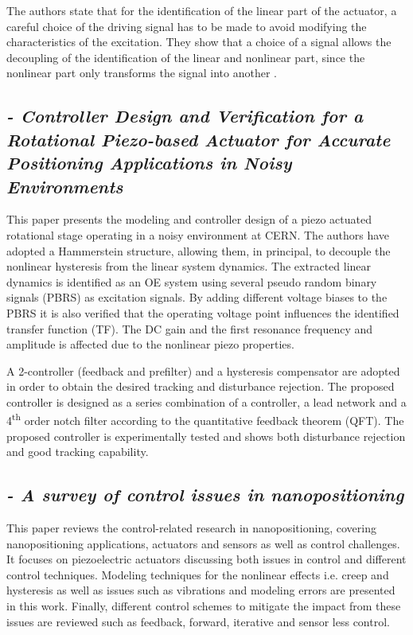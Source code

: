 The authors state that for the identification of the linear part of the actuator, a careful choice of the driving signal has to be made to avoid modifying the characteristics of the excitation. They show that a choice of a \abbrPBRS signal allows the decoupling of the identification of the linear and nonlinear part, since the nonlinear part only transforms the \abbrPBRS signal into another \abbrPBRS.



\subsection*{\citep*{ButcherController:2015} {\small \emph{- Controller Design and Verification for a Rotational Piezo-based Actuator for Accurate Positioning Applications in Noisy Environments}} }
This paper presents the modeling and controller design of a piezo actuated rotational stage operating in a noisy environment at CERN. The authors have adopted a Hammerstein structure, allowing them, in principal, to decouple the nonlinear hysteresis from the linear system dynamics. The extracted linear dynamics is identified as an OE system using several pseudo random binary signals (PBRS) as excitation signals. By adding different voltage biases to the PBRS it is also verified that the operating voltage point influences the identified transfer function (TF). The DC gain and the first resonance frequency and amplitude is affected due to the nonlinear piezo properties.

A 2-\abbrDOF controller (feedback and prefilter) and a hysteresis compensator are adopted in order to obtain the desired tracking and disturbance rejection. The proposed controller is designed as a series combination of a \abbrPID controller, a lead network and a 4\textsuperscript{th} order notch filter according to the quantitative feedback theorem (QFT). The proposed controller is experimentally tested and shows both disturbance rejection and good tracking capability.

\subsection*{\citep*{SurveyOfControlIssues:2007} {\small \emph{- A survey of control issues in nanopositioning}} }
This paper reviews the control-related research in nanopositioning, covering nanopositioning applications, actuators and sensors as well as control challenges. It focuses on piezoelectric actuators discussing both issues in control and different control techniques. Modeling techniques for the nonlinear effects i.e. creep and hysteresis as well as issues such as vibrations and modeling errors are presented in this work. Finally, different control schemes to mitigate the impact from these issues are reviewed such as feedback, forward, iterative and sensor less control.


